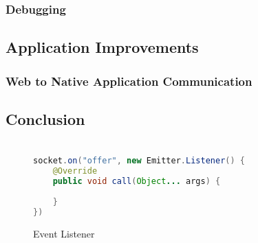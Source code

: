 \documentclass[]{report}
\begin{document}
			\subsection{Debugging}
		\section{Application Improvements}
			\subsection{Web to Native Application Communication}
		\section{Conclusion}
	
	\appendix
	\chapter{}
	\begin{figure}[h!]
		\caption{Event Listener}
		\begin{lstlisting}[language=Java,frame=single,breaklines=true]
socket.on("offer", new Emitter.Listener() {
	@Override
	public void call(Object... args) {
		
	}
})
		\end{lstlisting}
	\end{figure}
\end{document}
